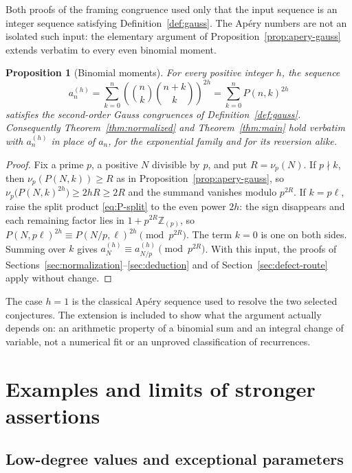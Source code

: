 \documentclass[11pt,letterpaper]{article}
\numberwithin{equation}{section}
\newtheorem{proposition}[theorem]{Proposition}
\theoremstyle{definition}
\newcommand{\Z}{\mathbb Z}
\newcommand{\Zp}{\Z_{(p)}}
\begin{document}
Both proofs of the framing congruence used only that the input sequence is
an integer sequence satisfying Definition~\ref{def:gauss}. The Ap\'ery
numbers are not an isolated such input: the elementary argument of
Proposition~\ref{prop:apery-gauss} extends verbatim to every even
binomial moment.

\begin{proposition}[Binomial moments]\label{prop:moments}
For every positive integer $h$, the sequence
\[
a_n^{(h)}=\sum_{k=0}^n\left(\binom nk\binom{n+k}k\right)^{2h}
=\sum_{k=0}^nP(n,k)^{2h}
\]
satisfies the second-order Gauss congruences of
Definition~\ref{def:gauss}. Consequently
Theorem~\ref{thm:normalized} and Theorem~\ref{thm:main} hold verbatim
with $a_n^{(h)}$ in place of $a_n$, for the exponential family and for its
reversion alike.
\end{proposition}

\begin{proof}
Fix a prime $p$, a positive $N$ divisible by $p$, and put $R=\nu_p(N)$.
If $p\nmid k$, then $\nu_p(P(N,k))\geq R$ as in
Proposition~\ref{prop:apery-gauss}, so
$\nu_p\bigl(P(N,k)^{2h}\bigr)\geq2hR\geq2R$ and the summand vanishes
modulo $p^{2R}$. If $k=p\ell$, raise the split product
\eqref{eq:P-split} to the even power $2h$: the sign disappears and each
remaining factor lies in $1+p^{2R}\Zp$, so
$P(N,p\ell)^{2h}\equiv P(N/p,\ell)^{2h}\pmod{p^{2R}}$. The term $k=0$ is
one on both sides. Summing over $k$ gives
$a_N^{(h)}\equiv a_{N/p}^{(h)}\pmod{p^{2R}}$. With this input, the proofs
of Sections~\ref{sec:normalization}--\ref{sec:deduction} and of
Section~\ref{sec:defect-route} apply without change.
\end{proof}

The case $h=1$ is the classical Ap\'ery sequence used to resolve the two
selected conjectures. The extension is included to show what the argument
actually depends on: an arithmetic property of a binomial sum and an
integral change of variable, not a numerical fit or an unproved
classification of recurrences.

\section{Examples and limits of stronger assertions}\label{sec:examples}

\subsection{Low-degree values and exceptional parameters}
\end{document}
